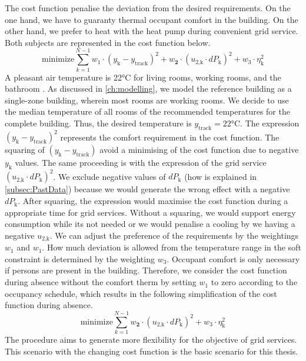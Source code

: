The cost function penalise the deviation from the desired requirements. On the one hand, we have to guaranty thermal occupant comfort in the building. On the other hand, we prefer to heat with the heat pump during convenient grid service. Both subjects are represented in the cost function below.
    \begin{equation}
        \text{minimize} \sum_{k=1}^{N-1} w_\text{1}\cdot (y_\text{k}-y_\text{track})^2 + w_\textbf{2}\cdot(u_\text{2,k}\cdot dP_\text{k})^2 + w_\text{3} \cdot \eta_\text{k}^2
        \label{eq:costfunctatsächlich}
    \end{equation}
A pleasant air temperature is 22°C for living rooms, working rooms, and the bathroom \cite{Umweltbundesamt.7.10.2021}. As discussed in \autoref{ch:modelling}, we model the reference building as a single-zone building, wherein most rooms are working rooms. We decide to use the median temperature of all rooms of the recommended temperatures for the complete building. Thus, the desired temperature is $y_\text{track} = 22$°C.\newline
The expression $(y_\text{k}-y_\text{track})^2$ represents the comfort requirement in the cost function. The squaring of $(y_\text{k}-y_\text{track})$ avoid a minimising of the cost function due to negative $y_\text{k}$ values. The same proceeding is with the expression of the grid service $(u_\text{2,k}\cdot dP_\text{k})^2$. We exclude negative values of $dP_\text{k}$ (how is explained in \autoref{subsec:PastData}) because we would generate the wrong effect with a negative $dP_\text{k}$. After squaring, the expression would maximise the cost function during a appropriate time for grid services. Without a squaring, we would support energy consumption while its not needed or we would penalise a cooling by we having a negative $u_\text{2,k}$.\newline
We can adjust the preference of the requirements by the weightings $w_\text{1}$ and $w_\text{1}$. How much deviation is allowed from the temperature range in the soft constraint is determined by the weighting $w_\text{3}$.\newline
Occupant comfort is only necessary if persons are present in the building. Therefore, we consider the cost function during absence without the comfort therm by setting $w_\text{1}$ to zero according to the occupancy schedule, which results in the following simplification of the cost function during absence.
    \begin{equation}
        \text{minimize} \sum_{k=1}^{N-1} w_\textbf{2}\cdot(u_\text{2,k}\cdot dP_\text{k})^2 + w_\text{3} \cdot \eta_\text{k}^2
        \label{eq:costfunctionAbwesenheit}
    \end{equation}
The procedure aims to generate more flexibility for the objective of grid services. This scenario with the changing cost function is the basic scenario for this thesis.  %

